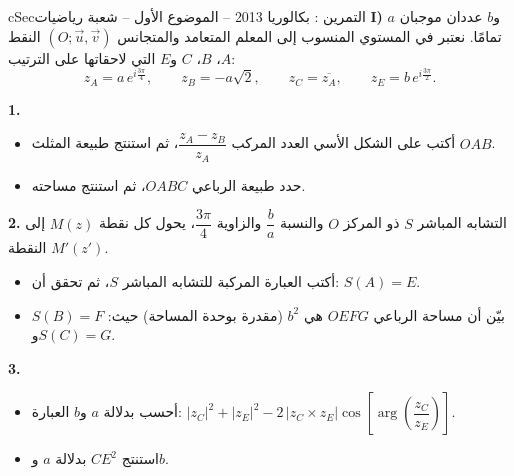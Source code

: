 \documentclass[12pt,a4paper]{article}
\newenvironment{BOX}[2]{\begin{otherlanguage}{english}\begin{arbox}{#1}{#2}}{\end{arbox}\end{otherlanguage}}
\newcounter{exo}
\newenvironment{tamrin}[1]{\stepcounter{exo}\begin{BOX}{cSec}{التمرين \theexo: #1}}{\end{BOX}}
\newenvironment{sq}{\begin{itemize}[leftmargin=2.4em,itemsep=3pt]}{\end{itemize}}
\newcommand{\qa}{\item[(أ)]}\newcommand{\qb}{\item[(ب)]}\newcommand{\qc}{\item[(جـ)]}\newcommand{\qd}{\item[(د)]}\newcommand{\qe}{\item[(هـ)]}
\newcommand{\QQ}[1]{\par\smallskip\textbf{#1.} }
\begin{document}
\begin{tamrin}{بكالوريا 2013 -- الموضوع الأول -- شعبة رياضيات}
\textbf{I)} $a$ و$b$ عددان موجبان تمامًا. نعتبر في المستوي المنسوب إلى المعلم المتعامد والمتجانس $(O;\vec u,\vec v)$ النقط $A$، $B$، $C$ و$E$ التي لاحقاتها على الترتيب:
\[z_A=a\,e^{i\frac{3\pi}{4}},\qquad z_B=-a\sqrt2,\qquad z_C=\overline{z_A},\qquad z_E=b\,e^{i\frac{3\pi}{2}}.\]
\QQ{1}
\begin{sq}
\qa أكتب على الشكل الأسي العدد المركب $\dfrac{z_A-z_B}{z_A}$، ثم استنتج طبيعة المثلث $OAB$.
\qb حدد طبيعة الرباعي $OABC$، ثم استنتج مساحته.
\end{sq}
\QQ{2} التشابه المباشر $S$ ذو المركز $O$ والنسبة $\dfrac{b}{a}$ والزاوية $\dfrac{3\pi}{4}$، يحول كل نقطة $M(z)$ إلى النقطة $M'(z')$.
\begin{sq}
\qa أكتب العبارة المركبة للتشابه المباشر $S$، ثم تحقق أن: $S(A)=E$.
\qb بيّن أن مساحة الرباعي $OEFG$ هي $b^2$ (مقدرة بوحدة المساحة) حيث: $S(B)=F$ و$S(C)=G$.
\end{sq}
\QQ{3}
\begin{sq}
\qa أحسب بدلالة $a$ و$b$ العبارة: $|z_C|^2+|z_E|^2-2\,|z_C\times z_E|\cos\left[\arg\left(\dfrac{z_C}{z_E}\right)\right]$.
\qb استنتج $CE^2$ بدلالة $a$ و$b$.
\end{sq}
\end{tamrin}
\end{document}
